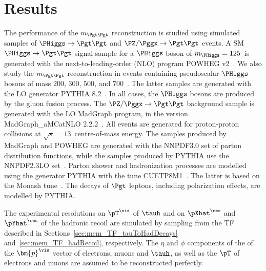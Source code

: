 \section{Results}
\label{sec:results}

The performance of the $m_{\Pgt\Pgt}$ reconstruction is studied using
simulated samples of $\PHiggs \to \Pgt\Pgt$ and $\PZ/\Pggx \to
\Pgt\Pgt$ events.
A SM $\PHiggs \to \Pgt\Pgt$ signal sample for a $\PHiggs$ boson of $m_{\PHiggs} = 125$~\GeV is generated with the next-to-leading-order (NLO) program POWHEG v2~\cite{POWHEG1,POWHEG2,POWHEG3}.
We also study the $m_{\Pgt\Pgt}$ reconstruction in events containing pseudoscalar $\PHiggs$ bosons of mass $200$, $300$, $500$, and $700$~\GeV.
The latter samples are generated with the LO generator PYTHIA 8.2~\cite{pythia8}.
In all cases, the $\PHiggs$ bosons are produced by the gluon fusion process.
The $\PZ/\Pggx \to \Pgt\Pgt$ background sample is generated with the LO MadGraph program, in the version MadGraph\_aMCatNLO 2.2.2~\cite{MadGraph_aMCatNLO}.
All events are generated for proton-proton collisions at $\sqrt{s} = 13$~\TeV centre-of-mass energy.
The samples produced by MadGraph and POWHEG are generated with the NNPDF3.0 set of parton distribution functions,
while the samples produced by PYTHIA use the NNPDF2.3LO set~\cite{NNPDF1,NNPDF2,NNPDF3}.
Parton shower and hadronization processes are modelled using the generator PYTHIA with the tune CUETP8M1~\cite{PYTHIA_CUETP8M1tune_CMS}.
The latter is based on the Monash tune~\cite{PYTHIA_MonashTune}.
The decays of $\Pgt$ leptons, including polarization effects, are modelled by PYTHIA.

The experimental resolutions on $\pT^{\vis}$ of $\tauh$ and on $\pXhat^{\rec}$ and $\pYhat^{\rec}$ of the hadronic recoil 
are simulated by sampling from the TF described in
Sections~\ref{sec:mem_TF_tauToHadDecays}
and~\ref{sec:mem_TF_hadRecoil}, respectively.
The $\eta$ and $\phi$ components of the of the $\bm{p}^{\vis}$ vector of electrons, muons and $\tauh$,
as well as the $\pT$ of electrons and muons are assumed to be reconstructed perfectly.

